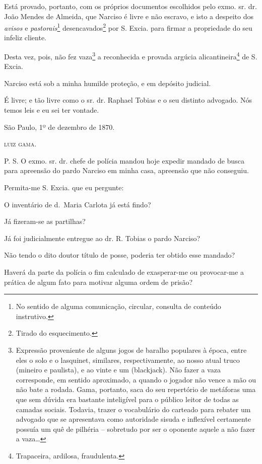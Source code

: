 {Está provado, portanto, com os próprios documentos escolhidos pelo exmo.
sr. dr. João Mendes de Almeida, que Narciso é livre e não escravo, e
isto a despeito dos \emph{avisos} e \emph{pastorais}\footnote{ No
  sentido de alguma comunicação, circular, consulta de conteúdo
  instrutivo.} desencavados\footnote{ Tirado do esquecimento.} por
S. Excia. para firmar a propriedade do seu infeliz cliente.

Desta vez, pois, não fez vaza\footnote{ Expressão proveniente de
  alguns jogos de baralho populares à época, entre eles o solo e o
  lasquinet, similares, respectivamente, ao nosso atual truco (mineiro e
  paulista), e ao vinte e um (blackjack). Não fazer a vaza corresponde,
  em sentido aproximado, a quando o jogador não vence a mão ou não bate
  a rodada. Gama, portanto, saca do seu repertório de metáforas uma que
  sem dúvida era bastante inteligível para o público leitor de todas as
  camadas sociais. Todavia, trazer o vocabulário do carteado para
  rebater um advogado que se apresentava como autoridade sisuda e
  inflexível certamente possuía um quê de pilhéria -- sobretudo por ser
  o oponente aquele a não fazer a vaza\ldots{}} a reconhecida e provada
argúcia alicantineira\footnote{ Trapaceira, ardilosa, fraudulenta.}
de S. Excia.

Narciso está sob a minha humilde proteção, e em depósito judicial.

É livre; e tão livre como o sr. dr. Raphael Tobias e o seu distinto
advogado. Nós temos leis e eu sei ter vontade.
\begin{flushright}
São Paulo, 1º de dezembro de 1870.

\textsc{luiz gama}.
\end{flushright}

P. S. O exmo. sr. dr. chefe de polícia mandou hoje expedir mandado de
busca para apreensão do pardo Narciso em minha casa, apreensão que não
conseguiu.

Permita-me S. Excia. que eu pergunte:

O inventário de d.~Maria Carlota já está findo?

Já fizeram-se as partilhas?

Já foi judicialmente entregue ao dr. R. Tobias o pardo Narciso?

Não tendo o dito doutor título de posse, poderia ter obtido esse
mandado?

Haverá da parte da polícia o fim calculado de exasperar-me ou
provocar-me a prática de algum fato para motivar alguma ordem de prisão?

}
